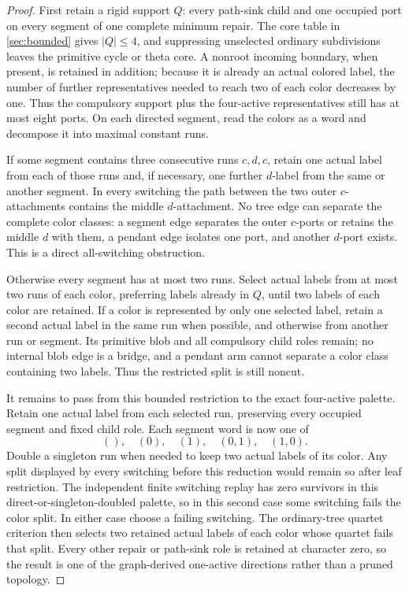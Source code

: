 \begin{proof}
First retain a rigid support \(Q\): every path-sink child and one occupied port
on every segment of one complete minimum repair.  The core table in
\cref{sec:bounded} gives \(|Q|\le4\), and suppressing unselected ordinary
subdivisions leaves the primitive cycle or theta core.  A nonroot incoming
boundary, when present, is retained in addition; because it is already an
actual colored label, the number of further representatives needed to reach
two of each color decreases by one.  Thus the compulsory support plus the
four-active representatives still has at most eight ports.  On each directed
segment, read the colors as a word and decompose it into maximal constant runs.

If some segment contains three consecutive runs \(c,d,c\), retain one actual
label from each of those runs and, if necessary, one further \(d\)-label from
the same or another segment.  In every switching the path between the two
outer \(c\)-attachments contains the middle \(d\)-attachment.  No tree edge
can separate the complete color classes: a segment edge separates the outer
\(c\)-ports or retains the middle \(d\) with them, a pendant edge isolates one
port, and another \(d\)-port exists.  This is a direct all-switching
obstruction.

Otherwise every segment has at most two runs.  Select actual labels from at
most two runs of each color, preferring labels already in \(Q\), until two
labels of each color are retained.  If a color is represented by only one
selected label, retain a second actual label in the same run when possible,
and otherwise from another run or segment.  Its primitive blob and all
compulsory child roles remain; no internal blob edge is a bridge, and a
pendant arm cannot separate a color class containing two labels.  Thus the
restricted split is still noncut.

It remains to pass from this bounded restriction to the exact four-active
palette.  Retain one actual label from each selected run, preserving every
occupied segment and fixed child role.  Each segment word is now one of
\[
 (),\quad(0),\quad(1),\quad(0,1),\quad(1,0).
\]
Double a singleton run when needed to keep two actual labels of its color.
Any split displayed by every switching before this reduction would remain so
after leaf restriction.  The independent finite switching replay has zero
survivors in this direct-or-singleton-doubled palette, so in this second case
some switching fails the color split.  In either case choose a failing
switching.  The ordinary-tree quartet criterion then selects two retained
actual labels of each color whose quartet fails that split.  Every
other repair or path-sink role is retained at character zero, so the result
is one of the graph-derived one-active directions rather than a pruned
topology.


\end{proof}
